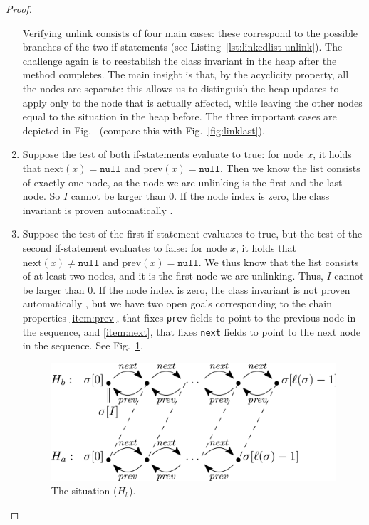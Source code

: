 \documentclass[runningheads]{llncs}
\begin{document}
\begin{proof}
\begin{enumerate}
    Verifying unlink consists of four main cases: these correspond to the possible branches of the two if-statements (see Listing~\ref{lst:linkedlist-unlink}). The challenge again is to reestablish the class invariant in the heap after the method completes. The main insight is that, by the acyclicity property, all the nodes are separate: this allows us to distinguish the heap updates to apply only to the node that is actually affected, while leaving the other nodes equal to the situation in the heap before. The three important cases are depicted in Fig.~ (compare this with Fig.~\ref{fig:linklast}).

    \item Suppose the test of both if-statements evaluate to true: for node $x$, it holds that $\mathrm{next}(x)=\mathtt{null}$ and $\mathrm{prev}(x)=\mathtt{null}$. Then we know the list consists of exactly one node, as the node we are unlinking is the first and the last node. So $I$ cannot be larger than 0. If the node index is zero, the class invariant is proven automatically .
    
    \item Suppose the test of the first if-statement evaluates to true, but the test of the second if-statement evaluates to false: for node $x$, it holds that $\mathrm{next}(x)\neq\mathtt{null}$ and $\mathrm{prev}(x)=\mathtt{null}$. We thus know that the list consists of at least two nodes, and it is the first node we are unlinking. Thus, $I$ cannot be larger than 0. If the node index is zero, the class invariant is not proven automatically , but we have two open goals corresponding to the chain properties \ref{item:prev}, that fixes \texttt{prev} fields to point to the previous node in the sequence, and \ref{item:next}, that fixes \texttt{next} fields to point to the next node in the sequence. See Fig.~\ref{fig:unlink-first}.

\begin{figure}
   \centering
   \includegraphics[scale=0.15]{figures/linkedlist-unlink-first.eps}
   \caption{The situation ($H_b$).}
   \vspace*{-12pt}
   \label{fig:unlink-first}
\end{figure}


\end{enumerate}
\end{proof}
\end{document}
